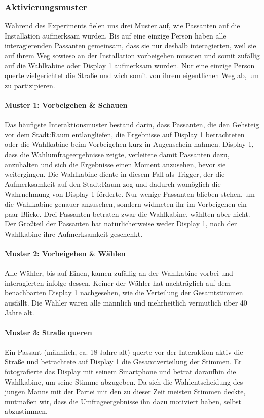 \subsubsection{Aktivierungsmuster}\label{aktivierungsmuster}

Während des Experiments fielen uns drei Muster auf, wie Passanten auf die Installation aufmerksam wurden.
Bis auf eine einzige Person haben alle interagierenden Passanten gemeinsam, dass sie nur deshalb interagierten, weil sie auf ihrem Weg sowieso an der Installation vorbeigehen mussten und somit zufällig auf die Wahlkabine oder Display 1
aufmerksam wurden.
Nur eine einzige Person querte zielgerichtet die Straße und wich somit von ihrem eigentlichen Weg ab, um zu partizipieren.

\paragraph{Muster 1: Vorbeigehen \& Schauen}
Das häufigste Interaktionsmuster bestand darin, dass Passanten, die den Gehsteig vor dem Stadt:Raum entlangliefen, die Ergebnisse auf Display 1 betrachteten oder die Wahlkabine beim Vorbeigehen kurz in Augenschein nahmen.
Display 1, dass die Wahlumfrageergebnisse zeigte, verleitete damit Passanten dazu, anzuhalten und sich die Ergebnisse einen Moment anzusehen, bevor sie weitergingen.
Die Wahlkabine diente in diesem Fall als Trigger, der die Aufmerksamkeit auf den Stadt:Raum zog und dadurch womöglich die Wahrnehmung von Display 1 förderte.
Nur wenige Passanten blieben stehen, um die Wahlkabine genauer anzusehen, sondern widmeten ihr im Vorbeigehen ein paar Blicke.
Drei Passanten betraten zwar die Wahlkabine, wählten aber nicht.
Der Großteil der Passanten hat natürlicherweise weder Display 1, noch der Wahlkabine ihre Aufmerksamkeit geschenkt.

\paragraph{Muster 2: Vorbeigehen \& Wählen}
Alle Wähler, bis auf Einen, kamen zufällig an der Wahlkabine vorbei und interagierten infolge dessen.
Keiner der Wähler hat nachträglich auf dem benachbarten Display 1 nachgesehen, wie die Verteilung der Gesamtstimmen ausfällt.
Die Wähler waren alle männlich und mehrheitlich vermutlich über 40 Jahre alt.

\paragraph{Muster 3: Straße queren}
Ein Passant (männlich, ca. 18 Jahre alt) querte vor der Interaktion aktiv die Straße und betrachtete auf Display 1 die Gesamtverteilung der Stimmen.
Er fotografierte das Display mit seinem Smartphone und betrat daraufhin die Wahlkabine, um seine Stimme abzugeben.
Da sich die Wahlentscheidung des jungen Manns mit der Partei mit den zu dieser Zeit meisten Stimmen deckte, mutmaßen wir, dass die Umfrageergebnisse ihn dazu motiviert haben, selbst abzustimmen.

